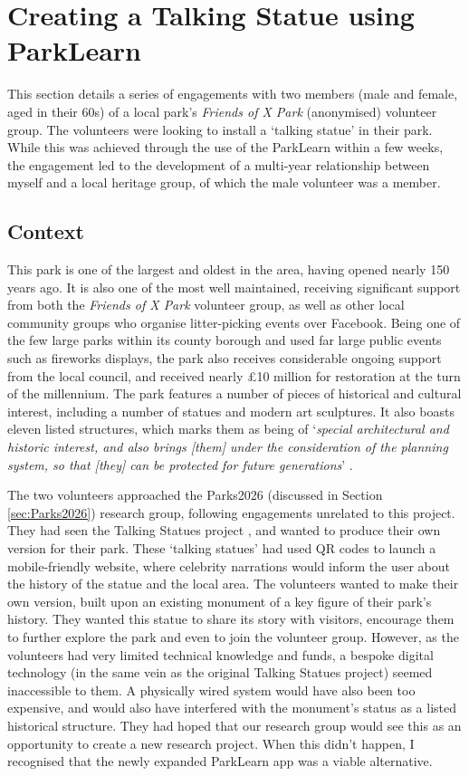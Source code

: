 \section{Creating a Talking Statue using ParkLearn}
\label{sec:TalkingStatue}

This section details a series of engagements with two members (male and female, aged in their 60s) of a local park's \textit{Friends of X Park} (anonymised) volunteer group. The volunteers were looking to install a `talking statue' in their park. While this was achieved through the use of the ParkLearn within a few weeks, the engagement led to the development of a multi-year relationship between myself and a local heritage group, of which the male volunteer was a member. 

\subsection{Context}
This park is one of the largest and oldest in the area, having opened nearly 150 years ago. It is also one of the most well maintained, receiving significant support from both the \textit{Friends of X Park} volunteer group, as well as other local community groups who organise litter-picking events over Facebook. Being one of the few large parks within its county borough and used far large public events such as fireworks displays, the park also receives considerable ongoing support from the local council, and received nearly £10 million for restoration at the turn of the millennium. The park features a number of pieces of historical and cultural interest, including a number of statues and modern art sculptures. It also boasts eleven listed structures, which marks them as being of `\textit{special architectural and historic interest, and also brings [them] under the consideration of the planning system, so that [they] can be protected for future generations}' \citep{HistoricEngland2020}. 

The two volunteers approached the Parks2026 (discussed in Section \ref{sec:Parks2026}) research group, following engagements unrelated to this project. They had seen the Talking Statues project \citep{Sing2017}, and wanted to produce their own version for their park. These `talking statues' had used QR codes to launch a mobile-friendly website, where celebrity narrations would inform the user about the history of the statue and the local area. The volunteers wanted to make their own version, built upon an existing monument of a key figure of their park's history. They wanted this statue to share its story with visitors, encourage them to further explore the park and even to join the volunteer group. However, as the volunteers had very limited technical knowledge and funds, a bespoke digital technology (in the same vein as the original Talking Statues project) seemed inaccessible to them. A physically wired system would have also been too expensive, and would also have interfered with the monument’s status as a listed historical structure. They had hoped that our research group would see this as an opportunity to create a new research project. When this didn't happen, I recognised that the newly expanded ParkLearn app was a viable alternative.

